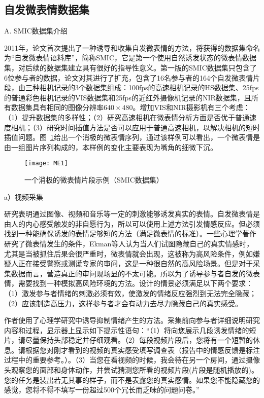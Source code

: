 \subsection{自发微表情数据集}

A. SMIC数据集介绍

2011年，论文首次提出了一种诱导和收集自发微表情的方法，将获得的数据集命名为“自发微表情语料库”，简称SMIC，它是第一个使用自然诱发状态的微表情数据集，对后续的数据集建立具有很好的指导性意义。第一版的SMIC数据集只包含了6位参与者的数据，论文对其进行了扩充，包含了16名参与者的164个自发微表情片段，由三种相机记录的3个数据集组成：100fps的高速相机记录的HS数据集、25fps的普通彩色相机记录的VIS数据集和25fps的近红外摄像机记录的NIR数据集，且所有数据集具有相同的图像分辨率$640\times480$。增加VIS和NIR摄影机有三个考虑：（1）提升数据集的多样性；（2）研究高速相机在微表情分析方面是否优于普通速度相机；（3）研究时间插值方法是否可以应用于普通高速相机，以解决相机的短时插值问题。图~\ref{fig2}给出一个消极的微表情序列，通过该样例可以看出，一个微表情是由一组图片序列构成的，本样例的变化主要表现为嘴角的细微下沉。

\begin{figure}[!htbp]
    \centering
    \texttt{[image: ME1]}
    \caption{一个消极的微表情片段示例（SMIC数据集）}
    \label{fig2}
\end{figure}


a）视频采集

研究表明通过图像、视频和音乐等一定的刺激能够诱发真实的表情\citep{Coan2015Handbook}。自发微表情是由人的内心感受触发的非自愿行为，所以可以使用上述方法引发情感反应。但必须找到一种能确保诱发的表情足够短的方法（满足微表情的标准）。一些心理学著作研究了微表情发生的条件，Ekman等人认为当人们试图隐藏自己的真实情感时，尤其是当被抓住后果会很严重时，微表情就会出现，这被称为高风险条件，例如嫌疑人正在接受警察或测谎专家的审问，这是一种很自然的高风险场景。但是对于采集数据而言，营造真正的审问现场显的不太可能。所以为了诱导参与者自发的微表情，需要找到一种模拟高风险环境的方法。设计的情景必须满足以下两个要求：（1）激发参与者情绪的刺激必须有效，使激发的情绪反应强烈到无法完全隐藏；（2）应该制造高压力，这样参与者才会有动力去尽力隐藏自己的真实感受。

作者使用了心理学研究中诱导抑制情绪产生的方法。采集前向参与者详细说明研究内容和过程，显示器上显示如下提示性语句：“（1）将向您展示几段诱发情绪的短片，请尽量保持头部稳定并仔细观看。（2）每段视频片段后，您将有一个短暂的休息。请根据您对刚才看到的视频的真实感受填写调查表（报告中的情感反馈是标注过程中的重要参考。）。（3）当您在看视频的时候，我会待在另一个房间，通过摄像头观察您的面部和身体动作，并尝试猜测您所看的视频片段(片段是随机播放的)。您的任务是装出若无其事的样子，而不是表露您的真实感情。如果您不能隐藏您的感觉，您将不得不填写一份超过500个冗长而乏味的问题问卷。”

